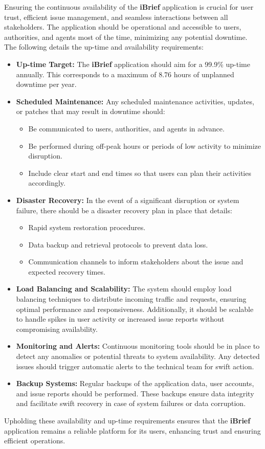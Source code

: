 Ensuring the continuous availability of the \textbf{iBrief} application is crucial for user trust, efficient issue management, and seamless interactions between all stakeholders. The application should be operational and accessible to users, authorities, and agents most of the time, minimizing any potential downtime. The following details the up-time and availability requirements:

\begin{itemize}
    \item \textbf{Up-time Target:} 
    The \textbf{iBrief} application should aim for a 99.9\% up-time annually. This corresponds to a maximum of 8.76 hours of unplanned downtime per year.

    \item \textbf{Scheduled Maintenance:} 
    Any scheduled maintenance activities, updates, or patches that may result in downtime should:
    \begin{itemize}
        \item Be communicated to users, authorities, and agents in advance.
        \item Be performed during off-peak hours or periods of low activity to minimize disruption.
        \item Include clear start and end times so that users can plan their activities accordingly.
    \end{itemize}
    
    \item \textbf{Disaster Recovery:}
    In the event of a significant disruption or system failure, there should be a disaster recovery plan in place that details:
    \begin{itemize}
        \item Rapid system restoration procedures.
        \item Data backup and retrieval protocols to prevent data loss.
        \item Communication channels to inform stakeholders about the issue and expected recovery times.
    \end{itemize}
    
    \item \textbf{Load Balancing and Scalability:}
    The system should employ \gls{load balancing} techniques to distribute incoming traffic and requests, ensuring optimal performance and responsiveness. Additionally, it should be scalable to handle spikes in user activity or increased issue reports without compromising availability.
    
    \item \textbf{Monitoring and Alerts:}
    Continuous monitoring tools should be in place to detect any anomalies or potential threats to system availability. Any detected issues should trigger automatic alerts to the technical team for swift action.

    \item \textbf{Backup Systems:}
    Regular backups of the application data, user accounts, and issue reports should be performed. These backups ensure data integrity and facilitate swift recovery in case of system failures or data corruption.

\end{itemize}

Upholding these availability and up-time requirements ensures that the \textbf{iBrief} application remains a reliable platform for its users, enhancing trust and ensuring efficient operations.
